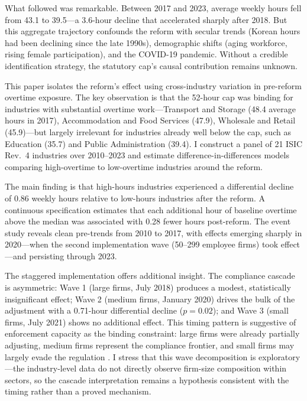 \documentclass[12pt]{article}
\begin{document}
What followed was remarkable. Between 2017 and 2023, average weekly hours fell from 43.1 to 39.5---a 3.6-hour decline that accelerated sharply after 2018. But this aggregate trajectory confounds the reform with secular trends (Korean hours had been declining since the late 1990s), demographic shifts (aging workforce, rising female participation), and the COVID-19 pandemic. Without a credible identification strategy, the statutory cap's causal contribution remains unknown.

This paper isolates the reform's effect using cross-industry variation in pre-reform overtime exposure. The key observation is that the 52-hour cap was binding for industries with substantial overtime work---Transport and Storage (48.4 average hours in 2017), Accommodation and Food Services (47.9), Wholesale and Retail (45.9)---but largely irrelevant for industries already well below the cap, such as Education (35.7) and Public Administration (39.4). I construct a panel of 21 ISIC Rev.~4 industries over 2010--2023 and estimate difference-in-differences models comparing high-overtime to low-overtime industries around the reform.

The main finding is that high-hours industries experienced a differential decline of 0.86 weekly hours relative to low-hours industries after the reform. A continuous specification estimates that each additional hour of baseline overtime above the median was associated with 0.28 fewer hours post-reform. The event study reveals clean pre-trends from 2010 to 2017, with effects emerging sharply in 2020---when the second implementation wave (50--299 employee firms) took effect---and persisting through 2023.

The staggered implementation offers additional insight. The compliance cascade is asymmetric: Wave 1 (large firms, July 2018) produces a modest, statistically insignificant effect; Wave 2 (medium firms, January 2020) drives the bulk of the adjustment with a 0.71-hour differential decline ($p = 0.02$); and Wave 3 (small firms, July 2021) shows no additional effect. This timing pattern is suggestive of enforcement capacity as the binding constraint: large firms were already partially adjusting, medium firms represent the compliance frontier, and small firms may largely evade the regulation \citep{lee2021}. I stress that this wave decomposition is exploratory---the industry-level data do not directly observe firm-size composition within sectors, so the cascade interpretation remains a hypothesis consistent with the timing rather than a proved mechanism.
\end{document}
